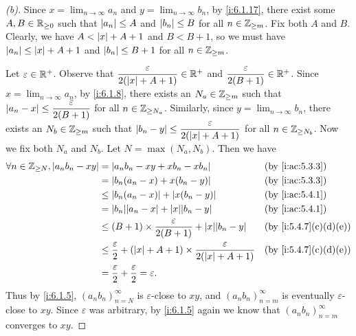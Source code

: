 \begin{proof}[(b)]
  Since \(x = \lim_{n \to \infty} a_n\) and \(y = \lim_{n \to \infty} b_n\), by \cref{i:6.1.17}, there exist some \(A, B \in \mathbb{R}_{\geq 0}\) such that \(\left\lvert a_n\right\rvert \leq A\) and \(\left\lvert b_n\right\rvert \leq B\) for all \(n \in \mathbb{Z}_{\geq m}\).
  Fix both \(A\) and \(B\).
  Clearly, we have \(A < \left\lvert x\right\rvert + A + 1\) and \(B < B + 1\), so we must have \(\left\lvert a_n\right\rvert \leq \left\lvert x\right\rvert + A + 1\) and \(\left\lvert b_n\right\rvert \leq B + 1\) for all \(n \in \mathbb{Z}_{\geq m}\).

  Let \(\varepsilon \in \mathbb{R}^+\).
  Observe that \(\dfrac{\varepsilon}{2 (\left\lvert x\right\rvert + A + 1)} \in \mathbb{R}^+\) and \(\dfrac{\varepsilon}{2 (B + 1)} \in \mathbb{R}^+\).
  Since \(x = \lim_{n \to \infty} a_n\), by \cref{i:6.1.8}, there exists an \(N_a \in \mathbb{Z}_{\geq m}\) such that \(\left\lvert a_n - x\right\rvert \leq \dfrac{\varepsilon}{2(B + 1)}\) for all \(n \in \mathbb{Z}_{\geq N_a}\).
  Similarly, since \(y = \lim_{n \to \infty} b_n\), there exists an \(N_b \in \mathbb{Z}_{\geq m}\) such that \(\left\lvert b_n - y\right\rvert \leq \dfrac{\varepsilon}{2 (\left\lvert x\right\rvert + A + 1)}\) for all \(n \in \mathbb{Z}_{\geq N_b}\).
  Now we fix both \(N_a\) and \(N_b\).
  Let \(N = \max(N_a, N_b)\).
  Then we have
  \begin{align*}
    \forall n \in \Z_{\geq N}, \abs{a_n b_n - x y} & = \abs{a_n b_n - x y + x b_n - x b_n}                                                           &  & \by{i:ac:5.3.3}     \\
                                                   & = \abs{b_n(a_n - x) + x(b_n - y)}                                                               &  & \by{i:ac:5.3.3}     \\
                                                   & \leq \abs{b_n(a_n - x)} + \abs{x(b_n - y)}                                                      &  & \by{i:ac:5.4.1}     \\
                                                   & = \abs{b_n}\abs{a_n - x} + \abs{x}\abs{b_n - y}                                                 &  & \by{i:ac:5.4.1}     \\
                                                   & \leq (B + 1) \times \dfrac{\varepsilon}{2 (B + 1)} + \abs{x}\abs{b_n - y}                       &  & \by{i:5.4.7}[c,d,e] \\
                                                   & \leq \dfrac{\varepsilon}{2} + (\abs{x} + A + 1) \times \dfrac{\varepsilon}{2 (\abs{x} + A + 1)} &  & \by{i:5.4.7}[c,d,e] \\
                                                   & = \dfrac{\varepsilon}{2} + \dfrac{\varepsilon}{2} = \varepsilon.
  \end{align*}
  Thus by \cref{i:6.1.5}, \((a_n b_n)_{n = N}^\infty\) is \(\varepsilon\)-close to \(xy\), and \((a_n b_n)_{n = m}^\infty\) is eventually \(\varepsilon\)-close to \(xy\).
  Since \(\varepsilon\) was arbitrary, by \cref{i:6.1.5} again we know that \((a_n b_n)_{n = m}^\infty\) converges to \(xy\).
\end{proof}

